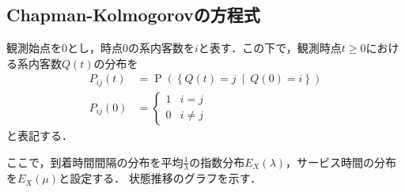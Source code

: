 \documentclass[a4j,papersize,disablejfam,slide,14pt]{jsarticle}
\def\cprob#1#2{\operatorname{P} \left(\left\{ #1 \ \middle|\ #2 \right\}\right)} %
\begin{document}
\subsection{{\rm Chapman-Kolmogorov}の方程式}
    観測始点を$0$とし，時点$0$の系内客数を$i$と表す．この下で，観測時点$t \geq 0$における系内客数$Q(t)$の分布を
    \begin{align}
    	P_{ij}(t) &= \cprob{Q(t) = j}{Q(0) = i} \\
        P_{ij}(0) &= 
        \begin{cases}
        	1 & \text{$i = j$} \\
            0 & \text{$i \neq j$}
        \end{cases}
    \end{align}
    と表記する．

	ここで，到着時間間隔の分布を平均$\frac{1}{\lambda}$の指数分布$E_X(\lambda)$，サービス時間の分布を$E_X(\mu)$と設定する．
    状態推移のグラフを示す．
\end{document}
